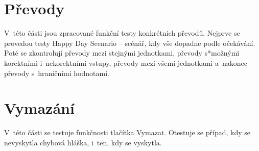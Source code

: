 	\section{Převody}
	V~této části jsou zpracované funkční testy konkrétních převodů. Nejprve se provedou testy Happy Day Scenario -- scénář, kdy vše dopadne podle očekávání. Poté se zkontrolují převody mezi stejnými jednotkami, převody s*možnými korektními i~nekorektními vstupy, převody mezi všemi jednotkami a~nakonec převody s~hraničními hodnotami.
	
	\section{Vymazání}
	V~této části se testuje funkčnosti tlačítka Vymazat. Otestuje se případ, kdy se nevyskytla chybová hláška, i~ten, kdy se vyskytla.